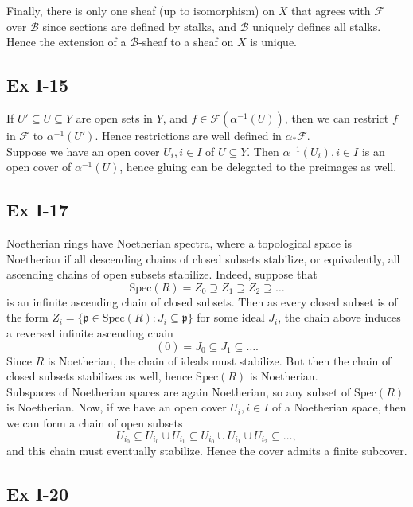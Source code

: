 \documentclass{article}
\theoremstyle{definition}
\newcommand{\Spec}{\text{Spec}}
\begin{document}
Finally, there is only one sheaf (up to isomorphism) on $X$ that agrees with
$\mathscr{F}$ over $\mathscr{B}$ since sections are defined by stalks, and
$\mathscr{B}$ uniquely defines all stalks. Hence the extension of a
$\mathscr{B}$-sheaf to a sheaf on $X$ is unique.


\subsection*{Ex I-15}

If $U' \subseteq U \subseteq Y$ are open sets in $Y$, and $f \in
\mathscr{F}(\alpha^{-1}(U))$, then we can restrict $f$ in $\mathscr{F}$ to
$\alpha^{-1}(U')$. Hence restrictions are well defined in $\alpha_*
\mathscr{F}$. \\

Suppose we have an open cover $U_i, i \in I$ of $U \subseteq Y$. Then
$\alpha^{-1}(U_i), i \in I$ is an open cover of $\alpha^{-1}(U)$, hence gluing
can be delegated to the preimages as well.

\subsection*{Ex I-17}

Noetherian rings have Noetherian spectra, where a topological space is
Noetherian if all descending chains of closed subsets stabilize, or
equivalently, all ascending chains of open subsets stabilize. Indeed, suppose
that 
\[
	\Spec(R) = Z_0 \supseteq Z_1 \supseteq Z_2 \supseteq \ldots
\] 
is an infinite ascending chain of closed subsets. Then as every closed subset
is of the form $Z_i = \{\mathfrak{p} \in \Spec(R) : J_i \subseteq
\mathfrak{p}\}$ for some ideal $J_i$, the chain above induces a reversed
infinite ascending chain 
\[
	(0) = J_0 \subseteq J_1 \subseteq \ldots.
\] 
Since $R$ is Noetherian, the chain of ideals must stabilize. But then the chain
of closed subsets stabilizes as well, hence $\Spec(R)$ is Noetherian. \\

Subspaces of Noetherian spaces are again Noetherian, so any subset of
$\Spec(R)$ is Noetherian. Now, if we have an open cover $U_i, i \in I$ of a
Noetherian space, then we can form a chain of open subsets
\[
	U_{i_0} 
	\subseteq 
	U_{i_0} \cup U_{i_1} 
	\subseteq 
	U_{i_0} \cup U_{i_1} \cup U_{i_2} 
	\subseteq 
	\ldots,
\] 
and this chain must eventually stabilize. Hence the cover admits a finite
subcover.

\subsection*{Ex I-20}
\end{document}

